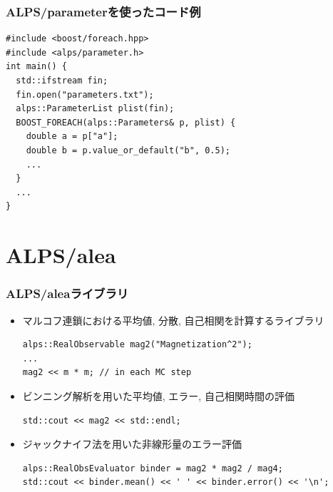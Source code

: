 \begin{frame}[t,fragile]
  \frametitle{ALPS/parameterを使ったコード例}
  \begin{lstlisting}
#include <boost/foreach.hpp>
#include <alps/parameter.h>
int main() {
  std::ifstream fin;
  fin.open("parameters.txt");
  alps::ParameterList plist(fin);
  BOOST_FOREACH(alps::Parameters& p, plist) {
    double a = p["a"];
    double b = p.value_or_default("b", 0.5);
    ...
  }
  ...
}
  \end{lstlisting}
\end{frame}

\section{ALPS/alea}
\begin{frame}[t,fragile]
  \frametitle{ALPS/aleaライブラリ}
  \begin{itemize}
  \item マルコフ連鎖における平均値, 分散, 自己相関を計算するライブラリ
    \begin{lstlisting}
alps::RealObservable mag2("Magnetization^2");
...
mag2 << m * m; // in each MC step
    \end{lstlisting}
  \item ビンニング解析を用いた平均値, エラー, 自己相関時間の評価
    \begin{lstlisting}
std::cout << mag2 << std::endl;
    \end{lstlisting}
  \item ジャックナイフ法を用いた非線形量のエラー評価
    \begin{lstlisting}
alps::RealObsEvaluator binder = mag2 * mag2 / mag4;
std::cout << binder.mean() << ' ' << binder.error() << '\n';
    \end{lstlisting}
  \end{itemize}
\end{frame}

